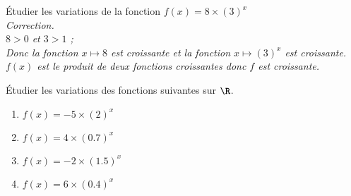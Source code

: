 \documentclass[11pt]{article}
\begin{document}
\begin{exercice}
Étudier les variations de la fonction $f(x) = 8 \times (3)^x$ \\
\textit{Correction. \\
$8>0$ et $3>1$ ; \\
Donc la fonction $x \mapsto 8$ est croissante et la fonction  $x \mapsto
(3)^x$ est croissante. \\
$f(x)$ est le produit de deux fonctions croissantes donc $f$ est croissante.}
\end{exercice}

\begin{exercice}
Étudier les variations des fonctions suivantes sur $\R$.
\begin{multicols}{2}
\begin{enumerate}
\item \( f(x) = -5 \times (2)^x \)
\item \( f(x) = 4 \times (0.7)^x \)
\item \( f(x) = -2 \times (1.5)^x \)
\item \( f(x) = 6 \times (0.4)^x \)
\end{enumerate}
\end{multicols}
\end{exercice}
\end{document}
